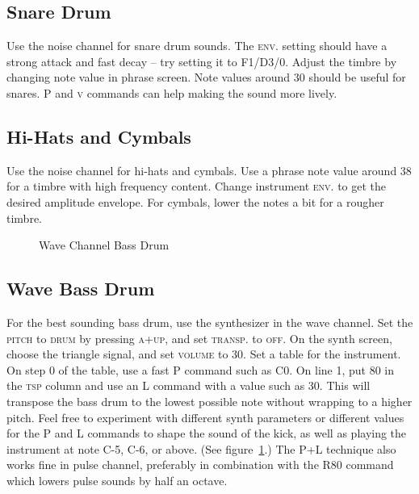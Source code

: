 \subsection{Snare Drum}

Use the noise channel for snare drum sounds. The \textsc{env.} setting should have a strong attack and fast decay -- try setting it to F1/D3/0.
Adjust the timbre by changing note value in phrase screen. Note values around 30 should be useful for snares.
\textsc{P} and \textsc{v} commands can help making the sound more lively.

\subsection{Hi-Hats and Cymbals}

Use the noise channel for hi-hats and cymbals. Use a phrase note value around 38 for a timbre with high frequency content. Change instrument \textsc{env.} to get the desired amplitude envelope. For cymbals, lower the notes a bit for a rougher timbre.

\begin{figure}[hbtp]
	\centering
	\qquad

	\qquad

	\caption{Wave Channel Bass Drum}
	\label{fig:wavekick}
\end{figure}

\subsection{Wave Bass Drum}

For the best sounding bass drum, use the synthesizer in the wave channel. Set the \textsc{pitch} to \textsc{drum} by pressing \textsc{a+up}, and set \textsc{transp.} to \textsc{off}. On the synth screen, choose the triangle signal, and set \textsc{volume} to 30. Set a table for the instrument. On step 0 of the table, use a fast P command such as C0. On line 1, put 80 in the \textsc{tsp} column and use an L command with a value such as 30. This will transpose the bass drum to the lowest possible note without wrapping to a higher pitch.  Feel free to experiment with different synth parameters or different values for the P and L commands to shape the sound of the kick, as well as playing the instrument at note C-5, C-6, or above. (See figure~\ref{fig:wavekick}.) The P+L technique also works fine in pulse channel, preferably in combination with the R80 command which lowers pulse sounds by half an octave.

